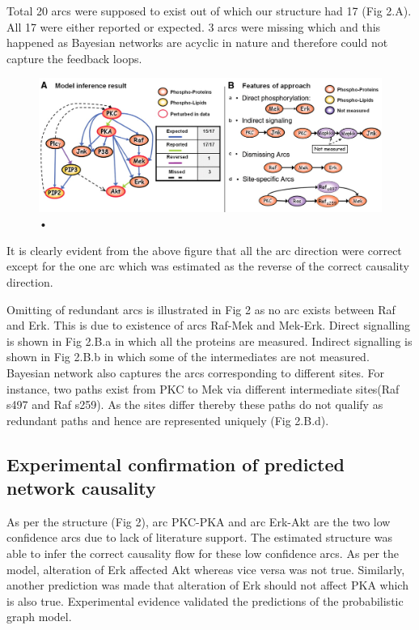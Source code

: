 \documentclass[conference]{IEEEtran}
\begin{document}
 Total 20 arcs were supposed to exist out of which our structure had 17 (Fig 2.A). All 17 were either reported or expected. 3 arcs were missing which and this happened as Bayesian networks are acyclic in nature and therefore could not capture the feedback loops.
\begin{figure}[h]
\centering
\includegraphics[width=\linewidth]{Images/Fig2.jpg}
\caption{•}
\end{figure}\par
It is clearly evident from the above figure that all the arc direction were correct except for the one arc which was estimated as the reverse of the correct causality direction.\par
Omitting of redundant arcs is illustrated in Fig 2 as no arc exists between Raf and Erk. This is due to existence of arcs Raf-Mek and Mek-Erk. Direct signalling is shown in Fig 2.B.a in which all the proteins are measured. Indirect signalling is shown in Fig 2.B.b in which some of the intermediates are not measured. Bayesian network also captures the arcs corresponding to different sites. For instance, two paths exist from PKC to Mek via different intermediate sites(Raf s497 and Raf s259). As the sites differ thereby these paths do not qualify as redundant paths and hence are represented uniquely (Fig 2.B.d).

\subsection{Experimental confirmation of predicted network causality}
As per the structure (Fig 2), arc PKC-PKA and arc Erk-Akt are the two low confidence arcs due to lack of literature support. The estimated structure was able to infer the correct causality flow for these low confidence arcs. As per the model, alteration of Erk affected Akt whereas vice versa was not true. Similarly, another prediction was made that alteration of Erk should not affect PKA which is also true. Experimental evidence validated the predictions of the probabilistic graph model.
\end{document}
